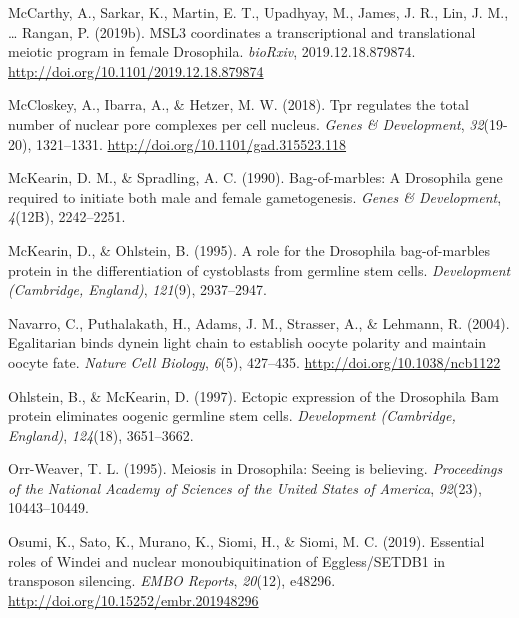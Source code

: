 \documentclass[12pt,oneside]{reedthesis}
\begin{document}
\leavevmode\hypertarget{ref-mccarthyMSL3CoordinatesTranscriptional2019a}{}%
McCarthy, A., Sarkar, K., Martin, E. T., Upadhyay, M., James, J. R., Lin, J. M., \ldots{} Rangan, P. (2019b). MSL3 coordinates a transcriptional and translational meiotic program in female Drosophila. \emph{bioRxiv}, 2019.12.18.879874. \url{http://doi.org/10.1101/2019.12.18.879874}

\leavevmode\hypertarget{ref-mccloskeyTprRegulatesTotal2018}{}%
McCloskey, A., Ibarra, A., \& Hetzer, M. W. (2018). Tpr regulates the total number of nuclear pore complexes per cell nucleus. \emph{Genes \& Development}, \emph{32}(19-20), 1321--1331. \url{http://doi.org/10.1101/gad.315523.118}

\leavevmode\hypertarget{ref-mckearinBagofmarblesDrosophilaGene1990}{}%
McKearin, D. M., \& Spradling, A. C. (1990). Bag-of-marbles: A Drosophila gene required to initiate both male and female gametogenesis. \emph{Genes \& Development}, \emph{4}(12B), 2242--2251.

\leavevmode\hypertarget{ref-mckearinRoleDrosophilaBagofmarbles1995}{}%
McKearin, D., \& Ohlstein, B. (1995). A role for the Drosophila bag-of-marbles protein in the differentiation of cystoblasts from germline stem cells. \emph{Development (Cambridge, England)}, \emph{121}(9), 2937--2947.

\leavevmode\hypertarget{ref-navarroEgalitarianBindsDynein2004a}{}%
Navarro, C., Puthalakath, H., Adams, J. M., Strasser, A., \& Lehmann, R. (2004). Egalitarian binds dynein light chain to establish oocyte polarity and maintain oocyte fate. \emph{Nature Cell Biology}, \emph{6}(5), 427--435. \url{http://doi.org/10.1038/ncb1122}

\leavevmode\hypertarget{ref-ohlsteinEctopicExpressionDrosophila1997}{}%
Ohlstein, B., \& McKearin, D. (1997). Ectopic expression of the Drosophila Bam protein eliminates oogenic germline stem cells. \emph{Development (Cambridge, England)}, \emph{124}(18), 3651--3662.

\leavevmode\hypertarget{ref-orr-weaverMeiosisDrosophilaSeeing1995}{}%
Orr-Weaver, T. L. (1995). Meiosis in Drosophila: Seeing is believing. \emph{Proceedings of the National Academy of Sciences of the United States of America}, \emph{92}(23), 10443--10449.

\leavevmode\hypertarget{ref-osumiEssentialRolesWindei2019}{}%
Osumi, K., Sato, K., Murano, K., Siomi, H., \& Siomi, M. C. (2019). Essential roles of Windei and nuclear monoubiquitination of Eggless/SETDB1 in transposon silencing. \emph{EMBO Reports}, \emph{20}(12), e48296. \url{http://doi.org/10.15252/embr.201948296}
\end{document}
